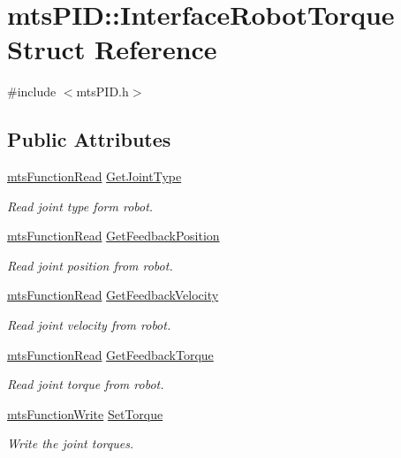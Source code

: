 \hypertarget{structmts_p_i_d_1_1_interface_robot_torque}{\section{mts\-P\-I\-D\-:\-:Interface\-Robot\-Torque Struct Reference}
\label{structmts_p_i_d_1_1_interface_robot_torque}
}


{\ttfamily \#include $<$mts\-P\-I\-D.\-h$>$}

\subsection*{Public Attributes}
\begin{DoxyCompactItemize}
\item 
\hyperlink{classmts_function_read}{mts\-Function\-Read} \hyperlink{structmts_p_i_d_1_1_interface_robot_torque_aa8d665775f11c3a1b25340727efe2d0c}{Get\-Joint\-Type}
\begin{DoxyCompactList}\small\item\em Read joint type form robot. \end{DoxyCompactList}\item 
\hyperlink{classmts_function_read}{mts\-Function\-Read} \hyperlink{structmts_p_i_d_1_1_interface_robot_torque_ad9c2f6fcbbe6c2252490cc8771193b2f}{Get\-Feedback\-Position}
\begin{DoxyCompactList}\small\item\em Read joint position from robot. \end{DoxyCompactList}\item 
\hyperlink{classmts_function_read}{mts\-Function\-Read} \hyperlink{structmts_p_i_d_1_1_interface_robot_torque_a366f8fdbec2f81579b25fab5ab27a61a}{Get\-Feedback\-Velocity}
\begin{DoxyCompactList}\small\item\em Read joint velocity from robot. \end{DoxyCompactList}\item 
\hyperlink{classmts_function_read}{mts\-Function\-Read} \hyperlink{structmts_p_i_d_1_1_interface_robot_torque_af2c054da656a47a76d69831ca0908bb4}{Get\-Feedback\-Torque}
\begin{DoxyCompactList}\small\item\em Read joint torque from robot. \end{DoxyCompactList}\item 
\hyperlink{classmts_function_write}{mts\-Function\-Write} \hyperlink{structmts_p_i_d_1_1_interface_robot_torque_a05317acc6fa8b2e125d2a6c3f5d55f86}{Set\-Torque}
\begin{DoxyCompactList}\small\item\em Write the joint torques. \end{DoxyCompactList}\end{DoxyCompactItemize}


